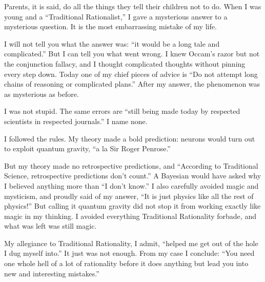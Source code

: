
Parents, it is said, do all the things they tell their children not to do. When I was young and a ``Traditional Rationalist,'' I gave a mysterious answer to a mysterious question. It is the most embarrassing mistake of my life.

I will not tell you what the answer was: ``it would be a long tale and complicated.'' But I can tell you what went wrong. I knew Occam's razor but not the conjunction fallacy, and I thought complicated thoughts without pinning every step down. Today one of my chief pieces of advice is ``Do not attempt long chains of reasoning or complicated plans.'' After my answer, the phenomenon was as mysterious as before.

I was not stupid. The same errors are ``still being made today by respected scientists in respected journals.'' I name none.

I followed the rules. My theory made a bold prediction: neurons would turn out to exploit quantum gravity, ``a la Sir Roger Penrose.'' 

But my theory made no retrospective predictions, and ``According to Traditional Science, retrospective predictions don't count.'' A Bayesian would have asked why I believed anything more than ``I don't know.'' I also carefully avoided magic and mysticism, and proudly said of my answer, ``It is just physics like all the rest of physics!'' But calling it quantum gravity did not stop it from working exactly like magic in my thinking. I avoided everything Traditional Rationality forbade, and what was left was still magic. 

My allegiance to Traditional Rationality, I admit, ``helped me get out of the hole I dug myself into.'' It just was not enough. From my case I conclude: ``You need one whole hell of a lot of rationality before it does anything but lead you into new and interesting mistakes.''

